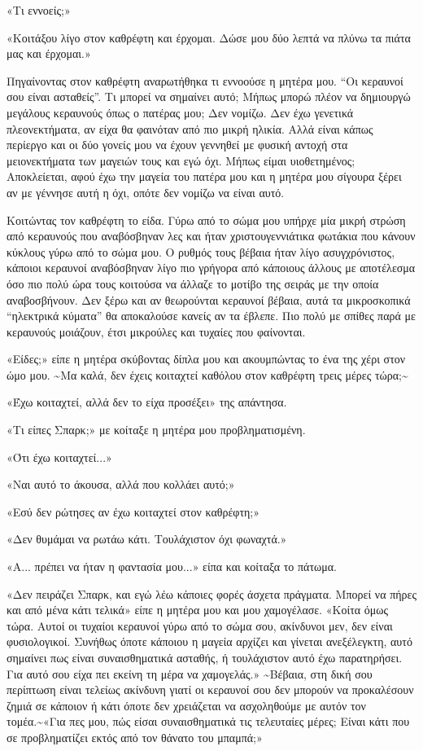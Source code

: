 \documentclass[12pt,twoside, openany]{book}
\begin{document}
«Τι εννοείς;»

«Κοιτάξου λίγο στον καθρέφτη και έρχομαι. Δώσε μου δύο λεπτά να πλύνω τα πιάτα μας και έρχομαι.»

Πηγαίνοντας στον καθρέφτη αναρωτήθηκα τι εννοούσε η μητέρα μου. “Οι κεραυνοί σου είναι ασταθείς”. Τι μπορεί να σημαίνει αυτό; Μήπως μπορώ πλέον να δημιουργώ μεγάλους κεραυνούς όπως ο πατέρας μου; Δεν νομίζω. Δεν έχω γενετικά πλεονεκτήματα, αν είχα θα φαινόταν από πιο μικρή ηλικία. Αλλά είναι κάπως περίεργο και οι δύο γονείς μου να έχουν γεννηθεί με φυσική αντοχή στα μειονεκτήματα των μαγειών τους και εγώ όχι. Μήπως είμαι υιοθετημένος; Αποκλείεται, αφού έχω την μαγεία του πατέρα μου και η μητέρα μου σίγουρα ξέρει αν με γέννησε αυτή η όχι, οπότε δεν νομίζω να είναι αυτό.

Κοιτώντας τον καθρέφτη το είδα. Γύρω από το σώμα μου υπήρχε μία μικρή στρώση από κεραυνούς που αναβόσβηναν λες και ήταν χριστουγεννιάτικα φωτάκια που κάνουν κύκλους γύρω από το σώμα μου. Ο ρυθμός τους βέβαια ήταν λίγο ασυγχρόνιστος, κάποιοι κεραυνοί αναβόσβηναν λίγο πιο γρήγορα από κάποιους άλλους με αποτέλεσμα όσο πιο πολύ ώρα τους κοιτούσα να άλλαζε το μοτίβο της σειράς με την οποία αναβοσβήνουν. Δεν ξέρω και αν θεωρούνται κεραυνοί βέβαια, αυτά τα μικροσκοπικά “ηλεκτρικά κύματα” θα αποκαλούσε κανείς αν τα έβλεπε. Πιο πολύ με σπίθες παρά με κεραυνούς μοιάζουν, έτσι μικρούλες και τυχαίες που φαίνονται.

«Είδες;» είπε η μητέρα σκύβοντας δίπλα μου και ακουμπώντας το ένα της χέρι στον ώμο μου. \textasciitilde Μα καλά, δεν έχεις κοιταχτεί καθόλου στον καθρέφτη τρεις μέρες τώρα;\textasciitilde 

«Έχω κοιταχτεί, αλλά δεν το είχα προσέξει» της απάντησα.

«Τι είπες Σπαρκ;» με κοίταξε η μητέρα μου προβληματισμένη.

«Ότι έχω κοιταχτεί...»

«Ναι αυτό το άκουσα, αλλά που κολλάει αυτό;»

«Εσύ δεν ρώτησες αν έχω κοιταχτεί στον καθρέφτη;»

«Δεν θυμάμαι να ρωτάω κάτι. Τουλάχιστον όχι φωναχτά.»

«Α... πρέπει να ήταν η φαντασία μου...» είπα και κοίταξα το πάτωμα.

«Δεν πειράζει Σπαρκ, και εγώ λέω κάποιες φορές άσχετα πράγματα. Μπορεί να πήρες και από μένα κάτι τελικά» είπε η μητέρα μου και μου χαμογέλασε. «Κοίτα όμως τώρα. Αυτοί οι τυχαίοι κεραυνοί γύρω από το σώμα σου, ακίνδυνοι μεν, δεν είναι φυσιολογικοί. Συνήθως όποτε κάποιου η μαγεία αρχίζει και γίνεται ανεξέλεγκτη, αυτό σημαίνει πως είναι συναισθηματικά ασταθής, ή τουλάχιστον αυτό έχω παρατηρήσει. Για αυτό σου είχα πει εκείνη τη μέρα να χαμογελάς.» \textasciitilde Βέβαια, στη δική σου περίπτωση είναι τελείως ακίνδυνη γιατί οι κεραυνοί σου δεν μπορούν να προκαλέσουν ζημιά σε κάποιον ή κάτι όποτε δεν χρειάζεται να ασχοληθούμε με αυτόν τον τομέα.\textasciitilde  «Για πες μου, πώς είσαι συναισθηματικά τις τελευταίες μέρες; Είναι κάτι που σε προβληματίζει εκτός από τον θάνατο του μπαμπά;»
\end{document}
